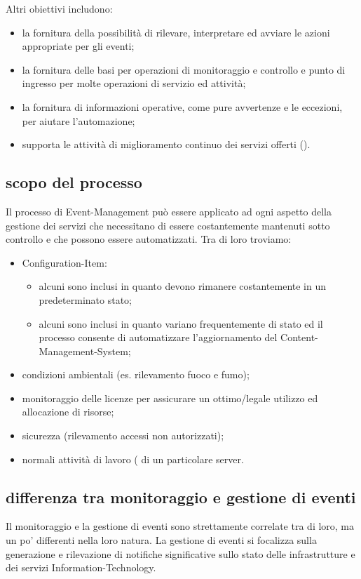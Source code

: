 Altri obiettivi includono:

\begin{itemize}
\item{la fornitura della possibilità di rilevare, interpretare ed avviare le azioni appropriate per gli eventi;}
\item{la fornitura delle basi per operazioni di monitoraggio e controllo e punto di ingresso per molte operazioni di servizio ed attività;}
\item{la fornitura di informazioni operative, come pure avvertenze e le eccezioni, per aiutare l'automazione;}
\item{supporta le attività di miglioramento continuo dei servizi offerti ().}
\end{itemize}

\subsection[Scopo del processo]{scopo del processo}
\label{prc-event-scope}
Il processo di \ac{Event-Management} può essere applicato ad ogni aspetto della gestione dei servizi che necessitano di essere costantemente mantenuti sotto controllo e che possono essere automatizzati. Tra di loro troviamo:

\begin{itemize}
\item{\ac{Configuration-Item}:}
\begin{itemize}
\item{alcuni sono inclusi in quanto devono rimanere costantemente in un predeterminato stato;}
\item{alcuni sono inclusi in quanto variano frequentemente di stato ed il processo consente di automatizzare l'aggiornamento del \ac{Content-Management-System};}
\end{itemize}
\item{condizioni ambientali (es. rilevamento fuoco e fumo);}
\item{monitoraggio delle licenze  per assicurare un ottimo/legale utilizzo ed allocazione di risorse;}
\item{sicurezza (rilevamento accessi non autorizzati);}
\item{normali attività di lavoro ( di un particolare server.}
\end{itemize}

\subsection[Differenza tra monitoraggio e gestione di eventi]{differenza tra monitoraggio e gestione di eventi}
\label{prc-event-difference}
Il monitoraggio e la gestione di eventi sono strettamente correlate tra di loro, ma un po' differenti nella loro natura. La gestione di eventi si focalizza sulla generazione e rilevazione di notifiche significative sullo stato delle infrastrutture e dei servizi \acs{Information-Technology}.


